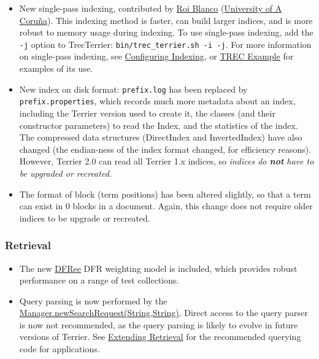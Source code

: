 \begin{itemize}
\tightlist
\item
  New single-pass indexing, contributed by
  \href{http://www.dc.fi.udc.es/~roi/}{Roi Blanco}
  (\href{http://www.udc.es/principal/en/}{University of A Coruña}). This
  indexing method is faster, can build larger indices, and is more
  robust to memory usage during indexing. To use single-pass indexing,
  add the \texttt{-j} option to TrecTerrier:
  \texttt{bin/trec\_terrier.sh\ -i\ -j}. For more information on
  single-pass indexing, see \href{configure_indexing.html}{Configuring
  Indexing}, or \href{trec_examples.html}{TREC Example} for examples of
  its use.
\item
  New index on disk format: \texttt{prefix.log} has been replaced by
  \texttt{prefix.properties}, which records much more metadata about an
  index, including the Terrier version used to create it, the classes
  (and their constructor parameters) to read the Index, and the
  statistics of the index. The compressed data structures (DirectIndex
  and InvertedIndex) have also changed (the endian-ness of the index
  format changed, for efficiency reasons). However, Terrier 2.0 can read
  all Terrier 1.x indices, so \emph{indices do \textbf{not} have to be
  upgraded or recreated.}
\item
  The format of block (term positions) has been altered slightly, so
  that a term can exist in 0 blocks in a document. Again, this change
  does not require older indices to be upgrade or recreated.
\end{itemize}

\subsubsection{Retrieval}\label{retrieval-7}

\begin{itemize}
\tightlist
\item
  The new \href{javadoc/org/terrier/matching/models/DFRee.html}{DFRee}
  DFR weighting model is included, which provides robust performance on
  a range of test collections.
\item
  Query parsing is now performed by the
  \href{javadoc/org/terrier/querying/Manager.html\#newSearchRequest(java.lang.String,\%20java.lang.String)}{Manager.newSearchRequest(String,String)}.
  Direct access to the query parser is now not recommended, as the query
  parsing is likely to evolve in future versions of Terrier. See
  \href{extending_retrieval.html}{Extending Retrieval} for the
  recommended querying code for applications.
\end{itemize}

